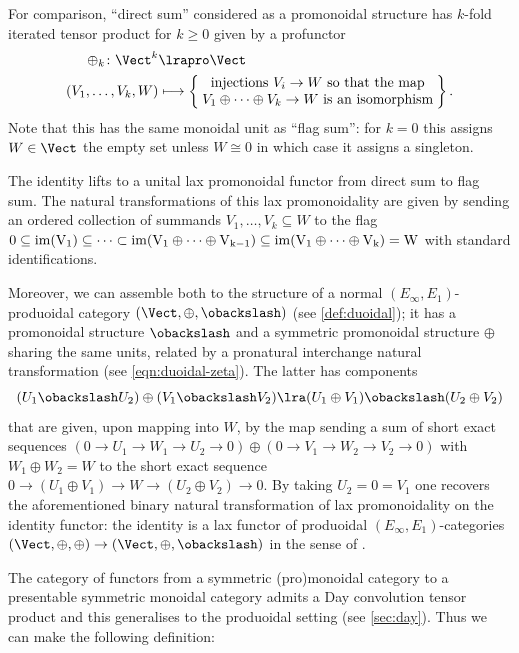 \documentclass[a4paper]{amsart}
\begin{document}
For comparison, ``direct sum'' considered as a promonoidal structure has $k$-fold iterated tensor product for $k \geq 0$ given by a profunctor
\begin{align*} \oplus_k \colon \Vect^k &\lrapro \Vect \\
(V_1,\ldots,V_k,W) &\longmapsto \left\{\text{\parbox[c]{6cm}{\centering injections $V_i \to W$ so that the map $V_1 \oplus \cdots \oplus V_k \to W$ is an isomorphism}}\right\}.\end{align*}
Note that this has the same monoidal unit as ``flag sum'': for $k=0$ this assigns $W \in \Vect$ the empty set unless $W \cong 0$ in which case it assigns a singleton.

The identity lifts to a unital lax promonoidal functor from direct sum to flag sum. The natural transformations of this lax promonoidality are given by sending an ordered collection of summands $V_1,\ldots,V_k \subseteq W$ to the flag $0\subseteq \rm{im}(V_1) \subseteq \cdots \subset \rm{im}(V_1 \oplus \cdots \oplus V_{k-1}) \subseteq \rm{im}(V_1 \oplus \cdots \oplus V_k) = W$
with standard identifications. 

Moreover, we can assemble both to the structure of a normal $(E_\infty,E_1)$-produoidal category $(\Vect,\oplus,\obackslash)$ (see \cref{def:duoidal}); it has a promonoidal structure $\obackslash$ and a symmetric promonoidal structure $\oplus$ sharing the same units, related by a pronatural interchange natural transformation (see \eqref{eqn:duoidal-zeta}). The latter has components
\[(U_1 \obackslash U_2) \oplus (V_1 \obackslash V_2) \lra (U_1 \oplus V_1) \obackslash (U_2 \oplus V_2)\]
that are given, upon mapping into $W$, by the map sending a sum of short exact sequences $(0 \to U_1 \to W_1 \to U_2 \to 0) \oplus (0 \to V_1 \to W_2 \to V_2 \to 0)$ with $W_1 \oplus W_2 = W$ to the short exact sequence $0 \to (U_1 \oplus V_1) \to W \to (U_2 \oplus V_2) \to 0$. By taking $U_2 = 0 = V_1$ one recovers the aforementioned binary natural transformation of lax promonoidality on the identity functor: the identity is a lax functor of produoidal $(E_\infty,E_1)$-categories $(\Vect,\oplus,\oplus) \to (\Vect,\oplus,\obackslash)$ in the sense of \cite[Definition 2.10]{BataninMarkl}.

The category of functors from a symmetric (pro)monoidal category to a presentable symmetric monoidal category admits a Day convolution tensor product and this generalises to the produoidal setting (see \cref{sec:day}). Thus we can make the following definition:
\end{document}
